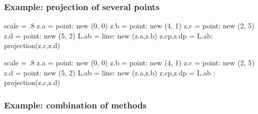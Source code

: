 \subsubsection{Example: projection of several points} %
\label{ssub:example_projection_of_several_points}
\begin{minipage}{0.5\textwidth}
\begin{tkzexample}[latex=0cm,small,code only]
\begin{tkzelements}
   scale     = .8
   z.a       = point:  new (0, 0)
   z.b       = point:  new (4, 1)
   z.c       = point:  new (2, 5)
   z.d       = point:  new (5, 2)
   L.ab      = line:   new (z.a,z.b)
   z.cp,z.dp = L.ab:  projection(z.c,z.d)
\end{tkzelements}
 \end{tkzexample}
\end{minipage}
\begin{minipage}{0.5\textwidth}
\begin{tkzelements}
scale  = .8
z.a    = point:  new (0, 0)
z.b    = point:  new (4, 1)
z.c    = point:  new (2, 5)
z.d    = point:  new (5, 2)
L.ab        = line:   new (z.a,z.b)
z.cp,z.dp   = L.ab :  projection(z.c,z.d)
\end{tkzelements}
\hspace*{\fill}
\hspace*{\fill}
\end{minipage}


\subsubsection{Example: combination of methods} %
\label{ssub:example_combination_of_methods}

